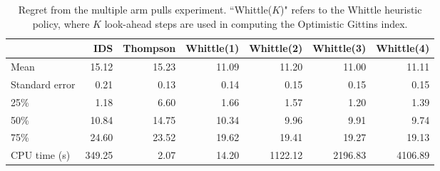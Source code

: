 \begin{table}
	\centering
	\begin{tabular}{lrrrrrr}
		\toprule
		{} &    IDS &  Thompson &  Whittle(1) &  Whittle(2) &  Whittle(3) &  Whittle(4) \\
		\midrule
		Mean           &  15.12 &     15.23 &       11.09 &       11.20 &       11.00 &       11.11 \\
		Standard error &   0.21 &      0.13 &        0.14 &        0.15 &        0.15 &        0.15 \\
		25\%            &   1.18 &      6.60 &        1.66 &        1.57 &        1.20 &        1.39 \\
		50\%            &  10.84 &     14.75 &       10.34 &        9.96 &        9.91 &        9.74 \\
		75\%            &  24.60 &     23.52 &       19.62 &       19.41 &       19.27 &       19.13 \\
		CPU time (s)   & 349.25 &      2.07 &       14.20 &     1122.12 &     2196.83 &     4106.89 \\
		\bottomrule
	\end{tabular}
	
	\caption{Regret from the multiple arm pulls experiment. ``Whittle($K$)" refers to the Whittle heuristic policy, where $K$ look-ahead steps are used in computing the Optimistic Gittins index.}
	\label{table:restless1_summary}
\end{table}